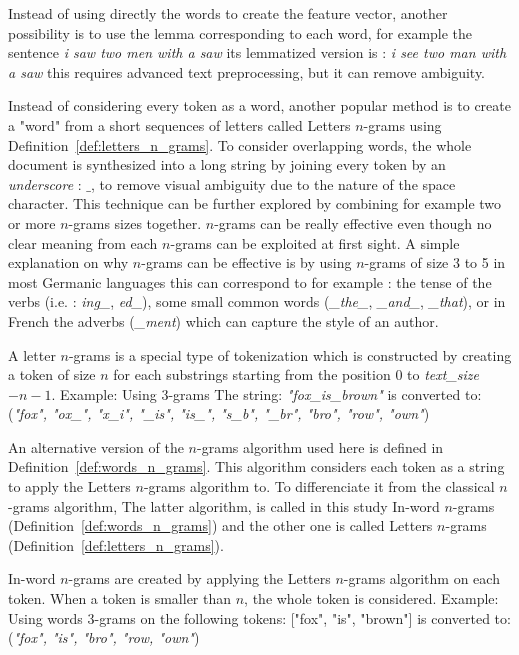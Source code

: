 Instead of using directly the words to create the feature vector, another possibility is to use the lemma corresponding to each word, for example the sentence \textit{i saw two men with a saw} its lemmatized version is : \textit{i see two man with a saw} this requires advanced text preprocessing, but it can remove ambiguity.

Instead of considering every token as a word, another popular method is to create a "word" from a short sequences of letters called Letters $n$-grams using Definition~\ref{def:letters_n_grams}.
To consider overlapping words, the whole document is synthesized into a long string by joining every token by an \textit{underscore} : $\_$, to remove visual ambiguity due to the nature of the space character.
This technique can be further explored by combining for example two or more $n$-grams sizes together.
$n$-grams can be really effective even though no clear meaning from each $n$-grams can be exploited at first sight.
A simple explanation on why $n$-grams can be effective is by using $n$-grams of size 3 to 5 in most Germanic languages this can correspond to for example : the tense of the verbs (i.e. : \textit{ing\_}, \textit{ed\_}), some small common words (\textit{\_the\_}, \textit{\_and\_}, \textit{\_that}), or in French the adverbs (\textit{\_ment}) which can capture the style of an author.

\begin{definition}
  \label{def:letters_n_grams}
  A letter $n$-grams is a special type of tokenization which is constructed by creating a token of size $n$ for each substrings starting from the position $0$ to \textit{text\_size} $- n - 1$.
  Example: Using 3-grams The string: \textit{"fox\_is\_brown"} is converted to: (\textit{"fox", "ox\_", "x\_i", "\_is", "is\_", "s\_b", "\_br", "bro", "row", "own"})
\end{definition}

An alternative version of the $n$-grams algorithm used here is defined in Definition~\ref{def:words_n_grams}.
This algorithm considers each token as a string to apply the Letters $n$-grams algorithm to.
To differenciate it from the classical $n$-grams algorithm,
The latter algorithm, is called in this study In-word $n$-grams (Definition~\ref{def:words_n_grams}) and the other one is called Letters $n$-grams (Definition~\ref{def:letters_n_grams}).

\begin{definition}
  \label{def:words_n_grams}
  In-word $n$-grams are created by applying the Letters $n$-grams algorithm on each token.
  When a token is smaller than $n$, the whole token is considered.
  Example: Using words 3-grams on the following tokens: ["fox", "is", "brown"] is converted to: (\textit{"fox", "is", "bro", "row, "own"})
\end{definition}


